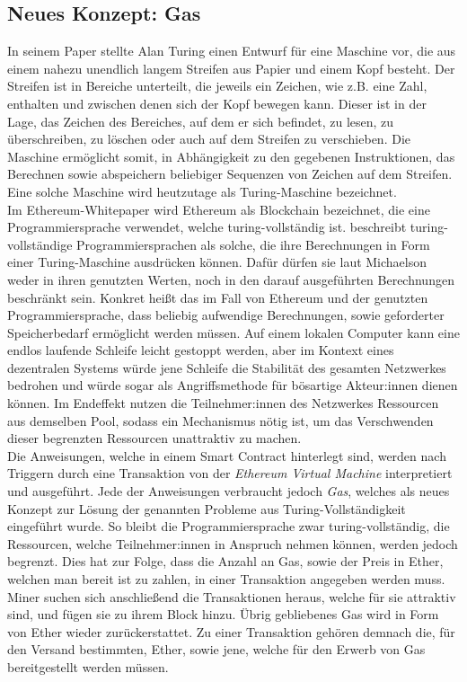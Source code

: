 \subsection{Neues Konzept: Gas}
In seinem Paper \cite{turing_1936} stellte Alan Turing einen Entwurf für eine Maschine vor, die aus einem nahezu unendlich langem Streifen aus Papier und einem Kopf besteht. Der Streifen ist in Bereiche unterteilt, die jeweils ein Zeichen, wie z.B. eine Zahl, enthalten und zwischen denen sich der Kopf bewegen kann. Dieser ist in der Lage, das Zeichen des Bereiches, auf dem er sich befindet, zu lesen, zu überschreiben, zu löschen oder auch auf dem Streifen zu verschieben. Die Maschine ermöglicht somit, in Abhängigkeit zu den gegebenen Instruktionen, das Berechnen sowie abspeichern beliebiger Sequenzen von Zeichen auf dem Streifen. Eine solche Maschine wird heutzutage als Turing-Maschine bezeichnet.\\

Im Ethereum-Whitepaper \cite{buterin_whitepaper_2013} wird Ethereum als Blockchain bezeichnet, die eine Programmiersprache verwendet, welche turing-vollständig ist. \cite{Michaelson_2020} beschreibt turing-vollständige Programmiersprachen als solche, die ihre Berechnungen in Form einer Turing-Maschine ausdrücken können. Dafür dürfen sie laut Michaelson weder in ihren genutzten Werten, noch in den darauf ausgeführten Berechnungen beschränkt sein. Konkret heißt das im Fall von Ethereum und der genutzten Programmiersprache, dass beliebig aufwendige Berechnungen, sowie geforderter Speicherbedarf ermöglicht werden müssen.
Auf einem lokalen Computer kann eine endlos laufende Schleife leicht gestoppt werden, aber im Kontext eines dezentralen Systems würde jene Schleife die Stabilität des gesamten Netzwerkes bedrohen und würde sogar als Angriffsmethode für bösartige Akteur:innen dienen können. Im Endeffekt nutzen die Teilnehmer:innen des Netzwerkes Ressourcen aus demselben Pool, sodass ein Mechanismus nötig ist, um das Verschwenden dieser begrenzten Ressourcen unattraktiv zu machen.\\

Die Anweisungen, welche in einem Smart Contract hinterlegt sind, werden nach Triggern durch eine Transaktion von der \emph{Ethereum Virtual Machine} interpretiert und ausgeführt. Jede der Anweisungen verbraucht jedoch \emph{Gas}, welches als neues Konzept zur Lösung der genannten Probleme aus Turing-Vollständigkeit eingeführt wurde. So bleibt die Programmiersprache zwar turing-vollständig, die Ressourcen, welche Teilnehmer:innen in Anspruch nehmen können, werden jedoch begrenzt. Dies hat zur Folge, dass die Anzahl an Gas, sowie der Preis in Ether, welchen man bereit ist zu zahlen, in einer Transaktion angegeben werden muss. Miner suchen sich anschließend die Transaktionen heraus, welche für sie attraktiv sind, und fügen sie zu ihrem Block hinzu. Übrig gebliebenes Gas wird in Form von Ether wieder zurückerstattet. Zu einer Transaktion gehören demnach die, für den Versand bestimmten, Ether, sowie jene, welche für den Erwerb von Gas bereitgestellt werden müssen.\newpage
